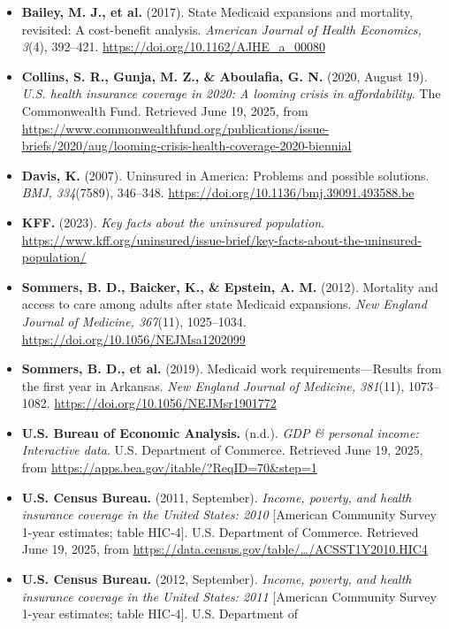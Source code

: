 \documentclass[
]{article}
\begin{document}
\begin{itemize}
\item
  \textbf{Bailey, M. J., et al.} (2017). State Medicaid expansions and
  mortality, revisited: A cost-benefit analysis. \emph{American Journal
  of Health Economics, 3}(4), 392--421.
  \url{https://doi.org/10.1162/AJHE_a_00080}
\item
  \textbf{Collins, S. R., Gunja, M. Z., \& Aboulafia, G. N.} (2020,
  August 19). \emph{U.S. health insurance coverage in 2020: A looming
  crisis in affordability}. The Commonwealth Fund. Retrieved June 19,
  2025, from
  \url{https://www.commonwealthfund.org/publications/issue-briefs/2020/aug/looming-crisis-health-coverage-2020-biennial}
\item
  \textbf{Davis, K.} (2007). Uninsured in America: Problems and possible
  solutions. \emph{BMJ, 334}(7589), 346--348.
  \url{https://doi.org/10.1136/bmj.39091.493588.be}
\item
  \textbf{KFF.} (2023). \emph{Key facts about the uninsured population}.
  \url{https://www.kff.org/uninsured/issue-brief/key-facts-about-the-uninsured-population/}
\item
  \textbf{Sommers, B. D., Baicker, K., \& Epstein, A. M.} (2012).
  Mortality and access to care among adults after state Medicaid
  expansions. \emph{New England Journal of Medicine, 367}(11),
  1025--1034. \url{https://doi.org/10.1056/NEJMsa1202099}
\item
  \textbf{Sommers, B. D., et al.} (2019). Medicaid work
  requirements---Results from the first year in Arkansas. \emph{New
  England Journal of Medicine, 381}(11), 1073--1082.
  \url{https://doi.org/10.1056/NEJMsr1901772}
\item
  \textbf{U.S. Bureau of Economic Analysis.} (n.d.). \emph{GDP \&
  personal income: Interactive data}. U.S. Department of Commerce.
  Retrieved June 19, 2025, from
  \url{https://apps.bea.gov/itable/?ReqID=70&step=1}
\item
  \textbf{U.S. Census Bureau.} (2011, September). \emph{Income, poverty,
  and health insurance coverage in the United States: 2010} {[}American
  Community Survey 1-year estimates; table HIC‑4{]}. U.S. Department of
  Commerce. Retrieved June 19, 2025, from
  \url{https://data.census.gov/table/…/ACSST1Y2010.HIC4}
\item
  \textbf{U.S. Census Bureau.} (2012, September). \emph{Income, poverty,
  and health insurance coverage in the United States: 2011} {[}American
  Community Survey 1-year estimates; table HIC‑4{]}. U.S. Department of

\end{itemize}
\end{document}
